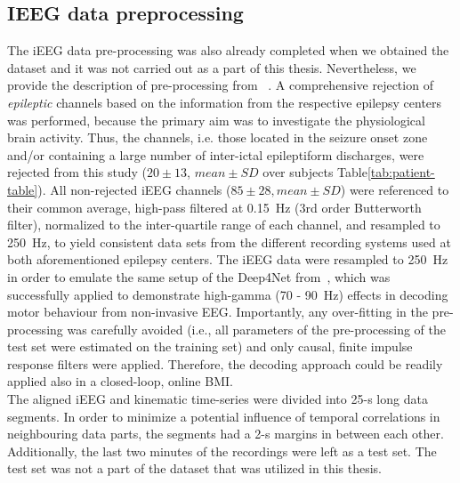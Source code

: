 \subsection{IEEG data preprocessing}\label{subsec:ieeg-data-preprocessing}
The iEEG data pre-processing was also already completed when we obtained the dataset and it was not carried out as a part of this thesis. Nevertheless, we provide the description of pre-processing from ~\cite{Hammer-2021}.
A comprehensive rejection of \textit{epileptic} channels based on the information from the respective epilepsy centers was performed, because the primary aim was to investigate the physiological brain activity.
Thus, the channels, i.e. those located in the seizure onset zone and/or containing a large number of inter-ictal epileptiform discharges, were rejected from this study ($20 \pm 13$, $mean \pm SD$ over subjects Table\ref{tab:patient-table}).
All non-rejected iEEG channels ($85 \pm 28, mean \pm SD$) were referenced to their common average, high-pass filtered at 0.15~Hz (3rd order Butterworth filter), normalized to the inter-quartile range of each channel, and resampled to 250~Hz, to yield consistent data sets from the different recording systems used at both aforementioned epilepsy centers.
The iEEG data were resampled to 250~Hz in order to emulate the same setup of the Deep4Net from~\cite{schirrmeister-deep-2017}, which was successfully applied to demonstrate high-gamma (70 - 90~Hz) effects in decoding motor behaviour from non-invasive EEG. Importantly, any over-fitting in the pre-processing was carefully avoided (i.e., all parameters of the pre-processing of the test set were estimated on the training set) and only causal, finite impulse response filters were applied.
Therefore, the decoding approach could be readily applied also in a closed-loop, online BMI. \\

The aligned iEEG and kinematic time-series were divided into 25-s long data segments.
In order to minimize a potential influence of temporal correlations in neighbouring data parts, the segments had a 2-s margins in between each other. Additionally, the last two minutes of the recordings were left as a test set. The test set was not a part of the dataset that was utilized in this thesis.


